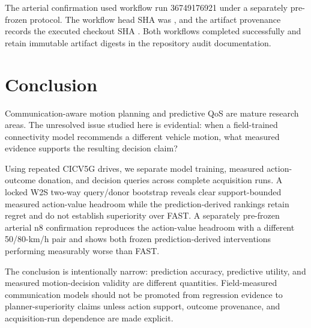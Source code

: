 \documentclass[journal]{IEEEtran}
\begin{document}
The arterial confirmation used workflow run 36749176921 under a separately pre-frozen protocol. The workflow head SHA was
, and the artifact provenance records the executed checkout SHA
. Both workflows completed successfully and retain immutable artifact digests in the repository audit documentation.

\section{Conclusion}
Communication-aware motion planning and predictive QoS are mature research areas. The unresolved issue studied here is evidential: when a field-trained connectivity model recommends a different vehicle motion, what measured evidence supports the resulting decision claim?

Using repeated CICV5G drives, we separate model training, measured action-outcome donation, and decision queries across complete acquisition runs. A locked W2S two-way query/donor bootstrap reveals clear support-bounded measured action-value headroom while the prediction-derived rankings retain regret and do not establish superiority over FAST. A separately pre-frozen arterial n8 confirmation reproduces the action-value headroom with a different 50/80-km/h pair and shows both frozen prediction-derived interventions performing measurably worse than FAST.

The conclusion is intentionally narrow: prediction accuracy, predictive utility, and measured motion-decision validity are different quantities. Field-measured communication models should not be promoted from regression evidence to planner-superiority claims unless action support, outcome provenance, and acquisition-run dependence are made explicit.



\end{document}
